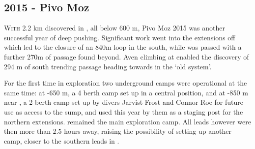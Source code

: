 \newpage
\begin{tcolorbox}
\chapter{2015 - Pivo Moz}
		\lettrine{W}{ith} 2.2 km discovered in , all below 600 m, Pivo Moz 2015 was another successful year of deep pushing. Significant work went into the extensions off  which led to the closure of an 840m loop in the south, while  was passed with a further 270m of passage found beyond. Aven climbing at  enabled the discovery of 294 m of south trending passage heading towards  in the `old system'. 

		For the first time in  exploration two underground camps were operational at the same time: at -650 m, a 4 berth camp set up in a central position, and  at -850 m near , a 2 berth camp set up by divers Jarvist Frost and Connor Roe for future use as access to the  sump, and used this year by them as a staging post for the northern extensions.  remained the main exploration camp. All leads however were then more than 2.5 hours away, raising the possibility of setting up another camp, closer to the southern leads in .
	

\end{tcolorbox}
\BgThispage



